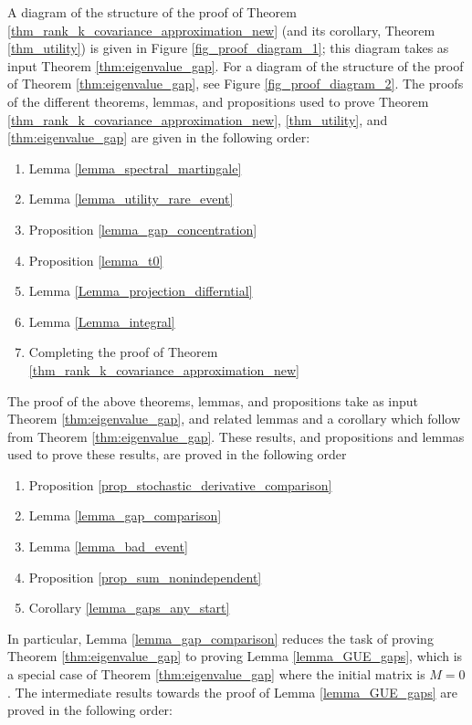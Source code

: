 \documentclass[11pt,letterpaper]{article}
\begin{document}
A diagram of the structure of the proof of Theorem \ref{thm_rank_k_covariance_approximation_new} (and its corollary, Theorem \ref{thm_utility}) is given in Figure \ref{fig_proof_diagram_1}; this diagram takes as input Theorem \ref{thm:eigenvalue_gap}.
%
 For a diagram of the structure of the proof of Theorem \ref{thm:eigenvalue_gap}, see Figure \ref{fig_proof_diagram_2}. 
%
The proofs of the different theorems, lemmas, and propositions used to prove Theorem \ref{thm_rank_k_covariance_approximation_new}, \ref{thm_utility}, and \ref{thm:eigenvalue_gap} are given in the following order:
%
\begin{enumerate}
\item Lemma \ref{lemma_spectral_martingale}
\item Lemma \ref{lemma_utility_rare_event}
\item Proposition \ref{lemma_gap_concentration}
\item Proposition \ref{lemma_t0}
\item Lemma \ref{Lemma_projection_differntial}
\item Lemma \ref{Lemma_integral}
\item Completing the proof of Theorem \ref{thm_rank_k_covariance_approximation_new}
\end{enumerate}
\noindent
The proof of the above theorems, lemmas, and propositions take as input Theorem \ref{thm:eigenvalue_gap}, and related lemmas and a corollary which follow from Theorem \ref{thm:eigenvalue_gap}.
%
These results, and propositions and lemmas used to prove these results, are  proved in the following order
%
\begin{enumerate}
\item[(8)] Proposition \ref{prop_stochastic_derivative_comparison}
\item[(9)] Lemma \ref{lemma_gap_comparison}
\item[(10)] Lemma \ref{lemma_bad_event}
\item[(11)] Proposition \ref{prop_sum_nonindependent}
\item[(12)] Corollary \ref{lemma_gaps_any_start}
\end{enumerate}
\noindent
In particular, Lemma \ref{lemma_gap_comparison} reduces the task of proving Theorem \ref{thm:eigenvalue_gap} to proving Lemma \ref{lemma_GUE_gaps}, which is a special case of Theorem \ref{thm:eigenvalue_gap} where the initial matrix is $M = 0$.
%
%
The intermediate results towards the proof of Lemma \ref{lemma_GUE_gaps} are proved in the following order:
%
\end{document}
